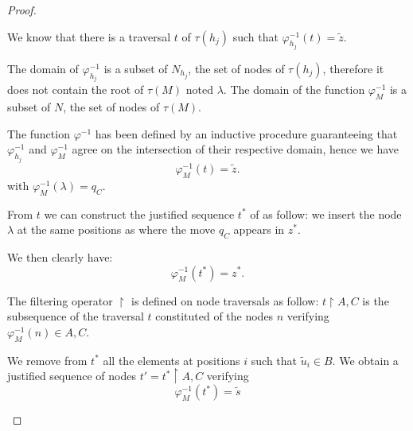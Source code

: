 \begin{proof}
\begin{itemize}
\begin{itemize}
        We know that there is a traversal $t$ of $\tau(h_j)$ such that
        $\varphi^{-1}_{h_j}(t) = \tilde{z}$.

        The domain of $\varphi^{-1}_{h_j}$ is a subset of $N_{h_j}$, the set of nodes of $\tau(h_j)$, therefore it does not contain
        the root of $\tau(M)$ noted $\lambda$. The domain of the function $\varphi^{-1}_{M}$ is a subset of $N$,
        the set of nodes  of $\tau(M)$.

        The function $\varphi^{-1}$ has been defined by an inductive procedure
        guaranteeing that $\varphi^{-1}_{h_j}$ and $\varphi^{-1}_{M}$
        agree on the intersection of their respective domain, hence we have
        \begin{equation}
        \varphi^{-1}_{M}(t) = \tilde{z}. \label{eq:def_t}
        \end{equation}
        with $\varphi^{-1}_{M}(\lambda) = q_C$.

        From $t$ we can construct the justified sequence $t^\ast$ of as follow:
        we insert the node $\lambda$ at the same positions as where the move $q_C$ appears in $z^\ast$.

        We then clearly have:
        \begin{equation}
        \varphi^{-1}_{M}(t^\ast) = z^\ast. \label{eq:def_tstar}
        \end{equation}


        The filtering operator $\upharpoonright$ is defined on node traversals as follow:
        $t\upharpoonright A,C$ is the subsequence of the traversal $t$ constituted of the nodes $n$
        verifying $\varphi^{-1}_M(n) \in A,C$.


        We remove from $t^\ast$ all the elements at positions $i$ such that $\tilde{u}_i \in B$.
        We obtain a justified sequence of nodes $t' = t^\ast \upharpoonright A,C$
        verifying
            $$\varphi^{-1}_{M}(t^\ast) = \tilde{s}$$



\end{itemize}
\end{itemize}
\end{proof}
